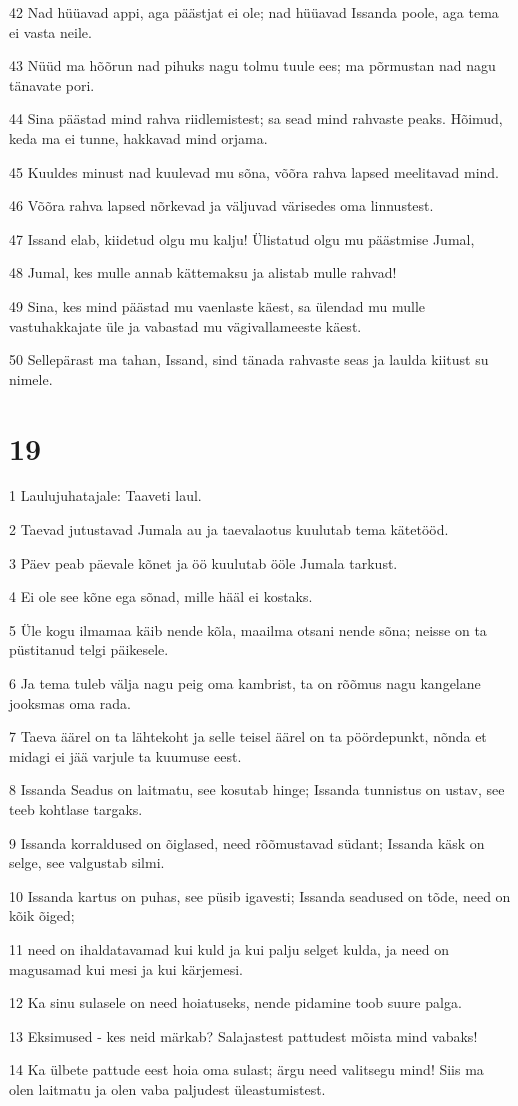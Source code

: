 \par 42 Nad hüüavad appi, aga päästjat ei ole; nad hüüavad Issanda poole, aga tema ei vasta neile.
\par 43 Nüüd ma hõõrun nad pihuks nagu tolmu tuule ees; ma põrmustan nad nagu tänavate pori.
\par 44 Sina päästad mind rahva riidlemistest; sa sead mind rahvaste peaks. Hõimud, keda ma ei tunne, hakkavad mind orjama.
\par 45 Kuuldes minust nad kuulevad mu sõna, võõra rahva lapsed meelitavad mind.
\par 46 Võõra rahva lapsed nõrkevad ja väljuvad värisedes oma linnustest.
\par 47 Issand elab, kiidetud olgu mu kalju! Ülistatud olgu mu päästmise Jumal,
\par 48 Jumal, kes mulle annab kättemaksu ja alistab mulle rahvad!
\par 49 Sina, kes mind päästad mu vaenlaste käest, sa ülendad mu mulle vastuhakkajate üle ja vabastad mu vägivallameeste käest.
\par 50 Sellepärast ma tahan, Issand, sind tänada rahvaste seas ja laulda kiitust su nimele.

\chapter{19}

\par 1 Laulujuhatajale: Taaveti laul.
\par 2 Taevad jutustavad Jumala au ja taevalaotus kuulutab tema kätetööd.
\par 3 Päev peab päevale kõnet ja öö kuulutab ööle Jumala tarkust.
\par 4 Ei ole see kõne ega sõnad, mille hääl ei kostaks.
\par 5 Üle kogu ilmamaa käib nende kõla, maailma otsani nende sõna; neisse on ta püstitanud telgi päikesele.
\par 6 Ja tema tuleb välja nagu peig oma kambrist, ta on rõõmus nagu kangelane jooksmas oma rada.
\par 7 Taeva äärel on ta lähtekoht ja selle teisel äärel on ta pöördepunkt, nõnda et midagi ei jää varjule ta kuumuse eest.
\par 8 Issanda Seadus on laitmatu, see kosutab hinge; Issanda tunnistus on ustav, see teeb kohtlase targaks.
\par 9 Issanda korraldused on õiglased, need rõõmustavad südant; Issanda käsk on selge, see valgustab silmi.
\par 10 Issanda kartus on puhas, see püsib igavesti; Issanda seadused on tõde, need on kõik õiged;
\par 11 need on ihaldatavamad kui kuld ja kui palju selget kulda, ja need on magusamad kui mesi ja kui kärjemesi.
\par 12 Ka sinu sulasele on need hoiatuseks, nende pidamine toob suure palga.
\par 13 Eksimused - kes neid märkab? Salajastest pattudest mõista mind vabaks!
\par 14 Ka ülbete pattude eest hoia oma sulast; ärgu need valitsegu mind! Siis ma olen laitmatu ja olen vaba paljudest üleastumistest.

